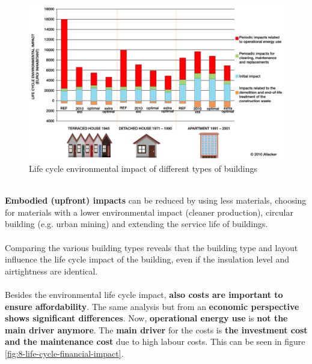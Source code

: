 \documentclass[../summary.tex]{subfiles}
\begin{document}
	\begin{figure}[H]
		\centering
		\includegraphics[width=0.8\linewidth]{../images/8-life-cycle-environmental-impact.png}
		\caption{Life cycle environmental impact of different types of buildings}
		\label{fig:8-life-cycle-environmental-impact}
	\end{figure}
	\ \\
	\textbf{Embodied (upfront) impacts }can be reduced by using less materials, choosing for materials with a lower environmental impact (cleaner production), circular building (e.g. urban mining) and extending the service life of buildings.\\
	\\
	Comparing the various building types reveals that the building type and layout influence the life cycle impact of the building, even if the insulation level and airtightness are identical.\\
	\\
	Besides the environmental life cycle impact, \textbf{also costs are important to ensure affordability}. The same analysis but from an \textbf{economic perspective shows significant differences}. Now, \textbf{operational energy use} is \textbf{not the main driver anymore}.
	The \textbf{main driver} for the costs is \textbf{the investment cost and the maintenance cost} due to high labour costs. This can be seen in figure \ref{fig:8-life-cycle-financial-impact}.
	
\end{document}
